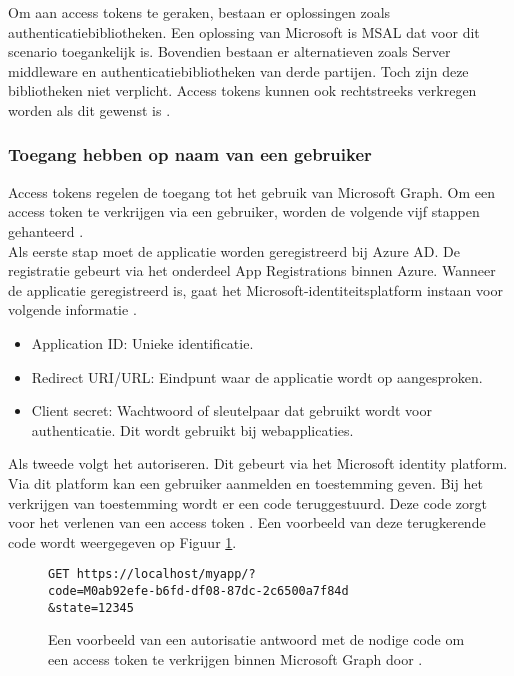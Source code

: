 Om aan access tokens te geraken, bestaan er oplossingen zoals authenticatiebibliotheken. Een oplossing van Microsoft is \ac{MSAL} dat voor dit scenario toegankelijk is. Bovendien bestaan er alternatieven zoals Server middleware en authenticatiebibliotheken van derde partijen. Toch zijn deze bibliotheken niet verplicht. Access tokens kunnen ook rechtstreeks verkregen worden als dit gewenst is \autocite{Microsoft2022b}. 

\subsubsection{Toegang hebben op naam van een gebruiker}


Access tokens regelen de toegang tot het gebruik van Microsoft Graph. Om een access token te verkrijgen via een gebruiker, worden de volgende vijf stappen gehanteerd \autocite{Microsoft2023r}. \\

Als eerste stap moet de applicatie worden geregistreerd bij Azure \ac{AD}. De registratie gebeurt via het onderdeel App Registrations binnen Azure. Wanneer de applicatie geregistreerd is, gaat het Microsoft-identiteitsplatform instaan voor volgende informatie \autocite{Microsoft2023r}. 

\begin{itemize}
    \item Application ID: Unieke identificatie.
    \item Redirect URI/URL: Eindpunt waar de applicatie wordt op aangesproken.
    \item Client secret: Wachtwoord of sleutelpaar dat gebruikt wordt voor authenticatie. Dit wordt gebruikt bij webapplicaties.
\end{itemize}

Als tweede volgt het autoriseren. Dit gebeurt via het Microsoft identity platform. Via dit platform kan een gebruiker aanmelden en toestemming geven. Bij het verkrijgen van toestemming wordt er een code teruggestuurd. Deze code zorgt voor het verlenen van een access token \autocite{Microsoft2023r}. Een voorbeeld van deze terugkerende code wordt weergegeven op Figuur \ref{MSGAR}. \\

\begin{figure}[h!]
    \scriptsize
    \begin{verbatim}
GET https://localhost/myapp/?
code=M0ab92efe-b6fd-df08-87dc-2c6500a7f84d
&state=12345
    \end{verbatim}    
    \caption[Voorbeeld Microsoft Graph Authorization response]{Een voorbeeld van een autorisatie antwoord met de nodige code om een access token te verkrijgen binnen Microsoft Graph door \textcite{Microsoft2023r}.}
    \label{MSGAR}
\end{figure}

